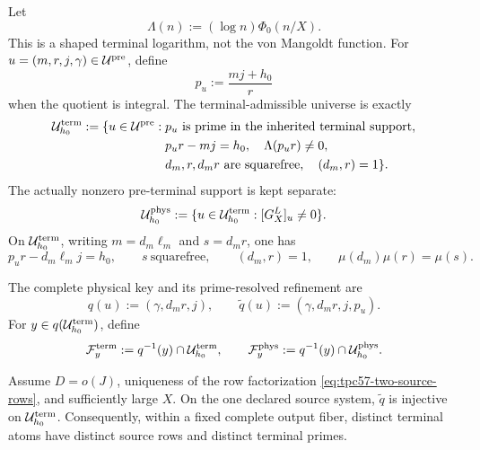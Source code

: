 Let
\begin{equation}
 \Lambda(n):=(\log n)\Phi_0(n/X).
 \label{eq:tpc57-shaped-terminal-weight}
\end{equation}
This is a shaped terminal logarithm, not the von Mangoldt function.  For
\(u=(m,r,j,\gamma)\in\mathcal U^{\rm pre}\), define
\begin{equation}
 p_u:=\frac{mj+h_0}{r}
 \label{eq:tpc57-terminal-prime-candidate}
\end{equation}
when the quotient is integral.  The terminal-admissible universe is exactly
\begin{equation}
 \begin{split}
 \mathcal U_{h_0}^{\rm term}:=\{u\in\mathcal U^{\rm pre}:{}&
 p_u\text{ is prime in the inherited terminal support},\\
 &p_ur-mj=h_0,\quad \Lambda(p_ur)\ne0,\\
 &d_m,r,d_mr\text{ are squarefree},\quad(d_m,r)=1\}.
 \end{split}
 \label{eq:tpc57-terminal-universe}
\end{equation}
The actually nonzero pre-terminal support is kept separate:
\begin{equation}
 \mathcal U_{h_0}^{\rm phys}
 :=\{u\in\mathcal U_{h_0}^{\rm term}:[G_X^L]_u\ne0\}.
 \label{eq:tpc57-physical-universe}
\end{equation}
On \(\mathcal U_{h_0}^{\rm term}\), writing \(m=d_m\ell_m\) and
\(s=d_mr\), one has
\begin{equation}
 p_ur-d_m\ell_mj=h_0,
 \qquad
 s\ \text{squarefree},
 \qquad
 (d_m,r)=1,
 \qquad
 \mu(d_m)\mu(r)=\mu(s).
 \label{eq:tpc57-terminal-equality-support}
\end{equation}

The complete physical key and its prime-resolved refinement are
\begin{equation}
 q(u):=(\gamma,d_mr,j),
 \qquad
 \widetilde q(u):=(\gamma,d_mr,j,p_u).
 \label{eq:tpc57-output-keys}
\end{equation}
For \(y\in q(\mathcal U_{h_0}^{\rm term})\), define
\begin{equation}
 \mathcal F_y^{\rm term}
 :=q^{-1}(y)\cap\mathcal U_{h_0}^{\rm term},
 \qquad
 \mathcal F_y^{\rm phys}
 :=q^{-1}(y)\cap\mathcal U_{h_0}^{\rm phys}.
 \label{eq:tpc57-terminal-and-physical-fibers}
\end{equation}

\begin{proposition}
\label{prop:tpc57-prime-resolved-injectivity}
Assume \(D=o(J)\), uniqueness of the row factorization
\eqref{eq:tpc57-two-source-rows}, and sufficiently large \(X\).  On the one
declared source system, \(\widetilde q\) is injective on
\(\mathcal U_{h_0}^{\rm term}\).  Consequently, within a fixed complete output
fiber, distinct terminal atoms have distinct source rows and distinct
terminal primes.
\end{proposition}

